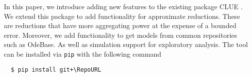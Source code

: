 In this paper, we introduce \ToolName adding new features to the existing package CLUE \cite{ovchinnikov_clue_2021,jimenez_clue_2022}.
We extend this package to add functionality for approximate reductions.
These are reductions that have more aggregating power at the expense of a bounded error\cite{leguizamon-robayo_approximate_2023}. 
Moreover, we add functionality to get models from common repositories such as OdeBase\cite{}. 
As well as simulation support for exploratory analysis.
The tool can be installed via \texttt{pip} with the following command

\begin{verbatim}
  $ pip install git+\RepoURL
\end{verbatim}









